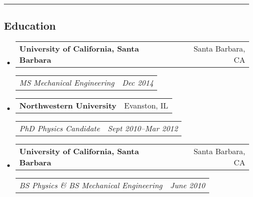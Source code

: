 \documentclass[10pt,letterpaper]{article}
\makeatletter
\newcommand{\headerrow}[2]{
\begin{tabular*}{\linewidth}{l@{\extracolsep{\fill}}r}
		#1 &
		#2 \\
	\end{tabular*}
}
\newcommand{\jobitem}[4]{\item \headerrow{\textbf{#1}}{#2}
\headerrow{\emph{#3}}{\emph{#4}}}
\makeatother
\begin{document}
\hrule
\subsection*{Education}
\begin{itemize}
	\jobitem{University of California, Santa Barbara}{Santa Barbara, CA}
		    {MS  Mechanical Engineering}{Dec 2014}
	\jobitem{Northwestern University}{Evanston, IL}
		    {PhD Physics Candidate}{Sept 2010--Mar 2012}
	\jobitem{University of California, Santa Barbara}{Santa Barbara, CA}	
		    {BS Physics \&  BS Mechanical Engineering}{June 2010}
\end{itemize}
\end{document}
